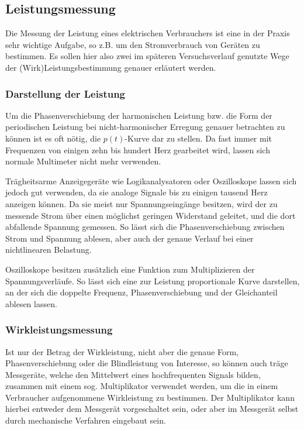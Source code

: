 \subsection{Leistungsmessung}
Die Messung der Leistung eines elektrischen Verbrauchers ist eine in der Praxis sehr wichtige Aufgabe, so z.B. um den Stromverbrauch von Geräten zu bestimmen. Es sollen hier also zwei im späteren Versuchsverlauf genutzte Wege der (Wirk)Leistungsbestimmung genauer erläutert werden.

\subsubsection{Darstellung der Leistung}
Um die Phasenverschiebung der harmonischen Leistung bzw. die Form der periodischen Leistung bei nicht-harmonischer Erregung genauer betrachten zu können ist es oft nötig, die $p(t)$-Kurve dar zu stellen. Da fast immer mit Frequenzen von einigen zehn bis hundert Herz gearbeitet wird, lassen sich normale Multimeter nicht mehr verwenden.

Trägheitsarme Anzeigegeräte wie Logikanalysatoren oder Oszilloskope lassen sich jedoch gut verwenden, da sie analoge Signale bis zu einigen tausend Herz anzeigen können. Da sie meist nur Spannungseingänge besitzen, wird der zu messende Strom über einen möglichst geringen Widerstand geleitet, und die dort abfallende Spannung gemessen. So lässt sich die Phasenverschiebung zwischen Strom und Spannung ablesen, aber auch der genaue Verlauf bei einer nichtlinearen Belastung.

Oszilloskope besitzen zusätzlich eine Funktion zum Multiplizieren der Spannungsverläufe. So lässt sich eine zur Leistung proportionale Kurve darstellen, an der sich die doppelte Frequenz, Phasenverschiebung und der Gleichanteil ablesen lassen.

\subsubsection{Wirkleistungsmessung}
Ist nur der Betrag der Wirkleistung, nicht aber die genaue Form, Phasenverschiebung oder die Blindleistung von Interesse, so können auch träge Messgeräte, welche den Mittelwert eines hochfrequenten Signals bilden, zusammen mit einem sog. Multiplikator verwendet werden, um die in einem Verbraucher aufgenommene Wirkleistung zu bestimmen. Der Multiplikator kann hierbei entweder dem Messgerät vorgeschaltet sein, oder aber im Messgerät selbst durch mechanische Verfahren eingebaut sein.

